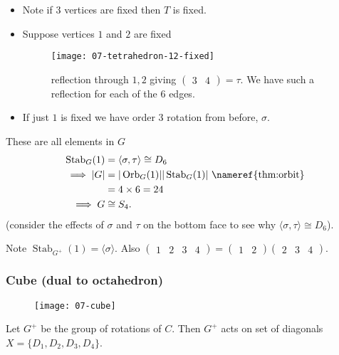 \begin{itemize}
    \item Note if $3$ vertices are fixed then $T$ is fixed.

    \item Suppose vertices $1$ and $2$ are fixed
    \begin{figure} 
        \centering 
        \texttt{[image: 07-tetrahedron-12-fixed]} 
        \caption{reflection through $1, 2$ giving $\begin{pmatrix}3 & 4\end{pmatrix} = \tau$. We have such a reflection for each of the $6$ edges.}
    \end{figure}

    \item If just $1$ is fixed we have order $3$ rotation from before, $\sigma$.
\end{itemize} 
These are all elements in $G$
\begin{align*}
    \operatorname{Stab}_G(1) &= \langle \sigma, \tau \rangle \cong D_6 \\
    \implies |G| &= |\operatorname{Orb}_G(1)| |\operatorname{Stab}_G(1)| \text{ \nameref{thm:orbit}}\\
    &= 4 \times 6 = 24 \\
    \implies G &\cong S_4.
\end{align*} (consider the effects of $\sigma$ and $\tau$ on the bottom face to see why $\langle \sigma, \tau \rangle \cong D_6$).

Note $\operatorname{Stab}_{G^+}(1) = \langle \sigma \rangle$.
Also $\begin{pmatrix}1 & 2 & 3 & 4\end{pmatrix} = \begin{pmatrix}1 & 2\end{pmatrix} \begin{pmatrix}2 & 3 & 4\end{pmatrix}$.

\subsubsection{Cube (dual to octahedron)}

\begin{figure}
    \centering 
    \texttt{[image: 07-cube]} 
\end{figure}

Let $G^+$ be the group of rotations of $C$.
Then $G^+$ acts on set of diagonals $X = \{D_1, D_2, D_3, D_4\}$.

